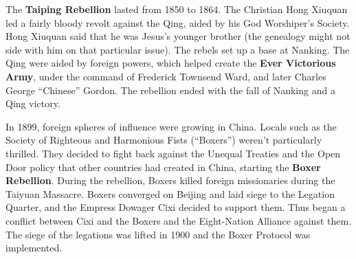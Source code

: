 The \textbf{Taiping Rebellion} lasted from 1850 to 1864.
The Christian Hong Xiuquan led a fairly bloody revolt against the Qing,
aided by his God Worshiper's Society.
Hong Xiuquan said that he was Jesus's younger brother
(the genealogy might not side with him on that particular issue).
The rebels set up a base at Nanking.
The Qing were aided by foreign powers,
which helped create the \textbf{Ever Victorious Army},
under the command of Frederick Townsend Ward, and later Charles George ``Chinese'' Gordon.
The rebellion ended with the fall of Nanking and a Qing victory.

In 1899, foreign spheres of influence were growing in China.
Locals such as the Society of Righteous and Harmonious Fists (``Boxers'') weren't particularly thrilled.
They decided to fight back against the Unequal Treaties and the Open Door policy
that other countries had created in China, starting the \textbf{Boxer Rebellion}.
During the rebellion, Boxers killed foreign missionaries during the Taiyuan Massacre.
Boxers converged on Beijing and laid siege to the Legation Quarter,
and the Empress Dowager Cixi decided to support them.
Thus began a conflict between Cixi and the Boxers and the Eight-Nation Alliance against them.
The siege of the legations was lifted in 1900 and the Boxer Protocol was implemented.

